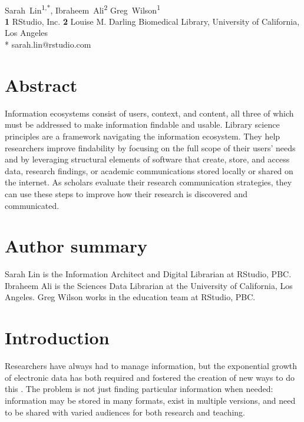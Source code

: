 \documentclass[10pt,letterpaper]{article}
\begin{document}
\vspace*{0.2in}

\begin{flushleft}
{\Large
\textbf{}
}
\newline
\\
{Sarah~Lin}\textsuperscript{1,*},
{Ibraheem~Ali}\textsuperscript{2}
{Greg~Wilson}\textsuperscript{1}
\\
\textbf{1} RStudio, Inc.
\textbf{2} Louise M. Darling Biomedical Library, University of California, Los Angeles
\\
\bigskip
* sarah.lin@rstudio.com
\end{flushleft}

\section*{Abstract}

Information ecosystems consist of users, context, and content, all three of
which must be addressed to make information findable and usable. Library science
principles are a framework navigating the information ecosystem. They help researchers
improve findability by focusing on the full scope of their users' needs and by leveraging 
structural elements of software that create, store, and access data,
research findings, or academic communications stored locally or shared on the
internet. As scholars evaluate their research communication strategies,
they can use these steps to improve how their research is discovered and communicated.

\section*{Author summary}

Sarah Lin is the Information Architect and Digital Librarian at RStudio, PBC.
Ibraheem Ali is the Sciences Data Librarian at the University of California, Los Angeles.
Greg Wilson works in the education team at RStudio, PBC.

\section*{Introduction}

Researchers have always had to manage information, but the exponential growth of
electronic data has both required and fostered the creation of new ways to do
this \cite{Rosenfeld2015,Hedden2016}. The problem is not just finding particular
information when needed: information may be stored in many formats, exist in
multiple versions, and need to be shared with varied audiences for both research
and teaching.
\end{document}
